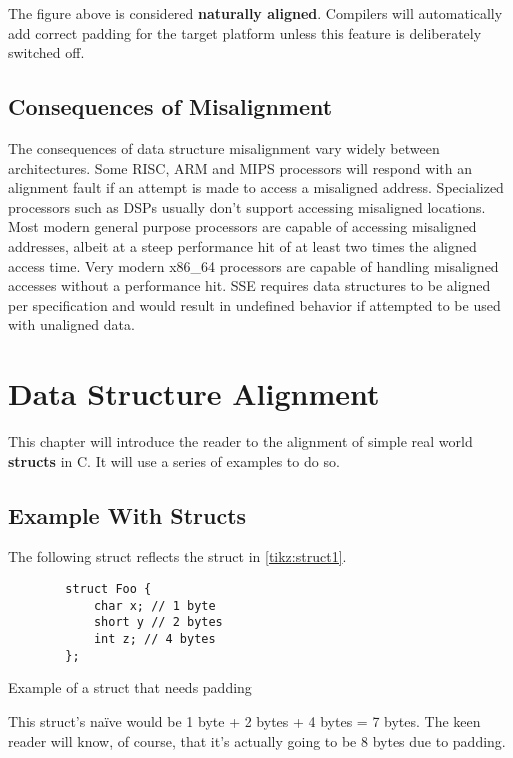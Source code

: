 \documentclass[a4paper,12pt]{scrartcl}
\begin{document}
\noindent
The figure above is considered \textbf{naturally aligned}. Compilers will automatically add
correct padding for the target platform unless this feature is deliberately switched off.

\subsection{Consequences of Misalignment}
The consequences of data structure misalignment vary widely between architectures. Some RISC, ARM
and MIPS processors will respond with an alignment fault if an attempt is made to access a
misaligned address. Specialized processors such as DSPs usually don't support accessing
misaligned locations. Most modern general purpose processors are capable of accessing misaligned addresses, albeit
at a steep performance hit of at least two times the aligned access time. Very modern x86\_64
processors are capable of handling misaligned accesses without a performance hit. SSE requires
data structures to be aligned per specification and would result in undefined behavior if
attempted to be used with unaligned data.

\section{Data Structure Alignment}
This chapter will introduce the reader to the alignment of simple real world \textbf{structs} in C.
It will use a series of examples to do so.
\subsection{Example With Structs}
The following struct reflects the struct in \autoref{tikz:struct1}.
\begin{listing}[H]
    \begin{verbatim}
        struct Foo {
            char x; // 1 byte
            short y // 2 bytes
            int z; // 4 bytes
        };
    \end{verbatim}
    \caption{Example of a struct that needs padding}
\end{listing}
\noindent
This struct's na\"ive would be 1 byte + 2 bytes + 4 bytes = 7 bytes. The keen reader will know, of 
course, that it's actually going to be 8 bytes due to padding.
\end{document}
